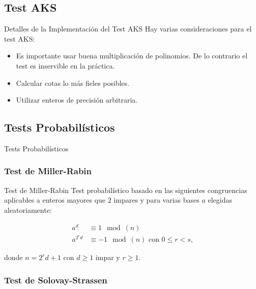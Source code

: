 \documentclass{beamer}
\begin{document}
\subsection{Test AKS}

\begin{frame}{Detalles de la Implementación del Test AKS}
	\onslide<1->Hay varias consideraciones para el test AKS:
	
	\begin{itemize}
		\item Es importante usar buena multiplicación de polinomios. De lo contrario el test es inservible en la práctica.
		
		\item Calcular cotas lo más fieles posibles.
		
		\item Utilizar enteros de precisión arbitraria.
	\end{itemize}
\end{frame}

\subsection{Tests Probabilísticos}

\begin{frame}
	\centering
	\begin{Large}
		Tests Probabilísticos
	\end{Large}
\end{frame}

\subsubsection{Test de Miller-Rabin}

\begin{frame}{Test de Miller-Rabin}
	Test probabilístico basado en las siguientes congruencias aplicables a enteros mayores que $2$ impares y para varias bases $a$ elegidas aleatoriamente:\break
	
	\begin{align}
	a^d &\equiv 1 \mod(n)\\
	a^{2^r d} &\equiv -1 \mod(n)\text{ con $0 \leq r < s$,}
	\end{align}
	
	donde $n = 2^rd + 1$ con $d \geq 1$ impar y $r \geq 1$.
\end{frame}

\subsubsection{Test de Solovay-Strassen}
\end{document}
